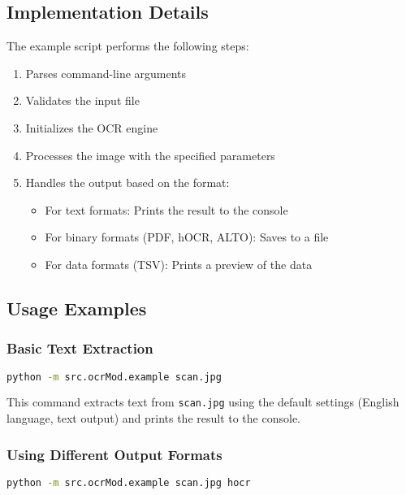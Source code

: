 \subsection{Implementation Details}

The example script performs the following steps:

\begin{enumerate}
  \item Parses command-line arguments
  \item Validates the input file
  \item Initializes the OCR engine
  \item Processes the image with the specified parameters
  \item Handles the output based on the format:
    \begin{itemize}
      \item For text formats: Prints the result to the console
      \item For binary formats (PDF, hOCR, ALTO): Saves to a file
      \item For data formats (TSV): Prints a preview of the data
    \end{itemize}
\end{enumerate}

\subsection{Usage Examples}

\subsubsection{Basic Text Extraction}

\begin{lstlisting}[language=bash]
python -m src.ocrMod.example scan.jpg
\end{lstlisting}

This command extracts text from \texttt{scan.jpg} using the default settings (English language, text output) and prints the result to the console.

\subsubsection{Using Different Output Formats}

\begin{lstlisting}[language=bash]
python -m src.ocrMod.example scan.jpg hocr
\end{lstlisting}


